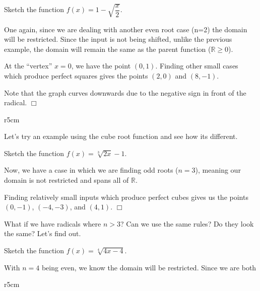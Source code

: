 \documentclass[lang=en,11pt]{elegantbook}
\begin{document}
\begin{example}
Sketch the function $f(x)=1-\sqrt{\dfrac{x}{2}}$.
\end{example}
\begin{solution}
One again, since we are dealing with another even root case (n=2) the domain will be restricted. Since the input is not being shifted, unlike the previous example, the domain will remain the same as the parent function ($\mathbb{R}\geq 0$).

At the “vertex” $x=0$, we have the point $(0,1)$. Finding other small cases which produce perfect squares gives the points $(2,0)$ and $(8,-1)$.

Note that the graph curves downwards due to the negative sign in front of the radical. $\Box$
\end{solution}

\begin{wrapfigure}{r}{5cm}
\end{wrapfigure}

Let's try an example using the cube root function and see how its different.
\begin{example}
Sketch the function $f(x)=\sqrt[3]{2x}-1$.
\end{example}
\begin{solution}
Now, we have a case in which we are finding odd roots ($n=3$), meaning our domain is not restricted and spans all of $\mathbb{R}$. 
\end{solution}
Finding relatively small inputs which produce perfect cubes gives us the points $(0,-1)$, $(-4,-3)$, and $(4,1)$. $\Box$

What if we have radicals where $n>3$? Can we use the same rules? Do they look the same? Let's find out.

\begin{example}
Sketch the function $f(x)=\sqrt[4]{4x-4}$.
\end{example}
\begin{solution}
With $n=4$ being even, we know the domain will be restricted. Since we are both 
\end{solution}

\begin{wrapfigure}{r}{5cm}
\end{wrapfigure}
\end{document}

